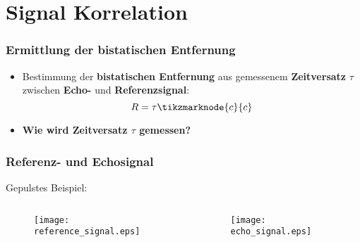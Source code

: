 \section{Signal Korrelation}

\begin{frame}
    \frametitle{Ermittlung der bistatischen Entfernung}

    \begin{itemize}
        \centering
        \item Bestimmung der \textbf{bistatischen Entfernung} aus gemessenem \textbf{Zeitversatz} \(\tau\) zwischen \textbf{Echo-} und \textbf{Referenzsignal}:
              \begin{equation}
                  R = \tau \tikzmarknode{c}{c}
              \end{equation}

              \vspace{\baselineskip}

        \item<2-> \textbf{Wie wird Zeitversatz \(\tau\) gemessen?}
    \end{itemize}
\end{frame}

\begin{frame}
    \frametitle{Referenz- und Echosignal}

    Gepulstes Beispiel:
    \begin{columns}
        \begin{column}{0.5\textwidth}
            \begin{figure}
                \centering
                \texttt{[image: reference\_signal.eps]}
            \end{figure}
        \end{column}
        \begin{column}{0.5\textwidth}
            \begin{figure}
                \centering
                \texttt{[image: echo\_signal.eps]}
            \end{figure}
        \end{column}
    \end{columns}
\end{frame}

